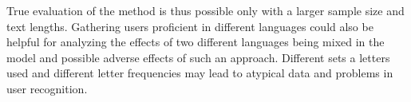 True evaluation of the method is thus possible only with a larger sample size and text lengths. Gathering users proficient in different languages could also be helpful for analyzing the effects of two different languages being mixed in the model and possible adverse effects of such an approach. Different sets a letters used and different letter frequencies may lead to atypical data and problems in user recognition.